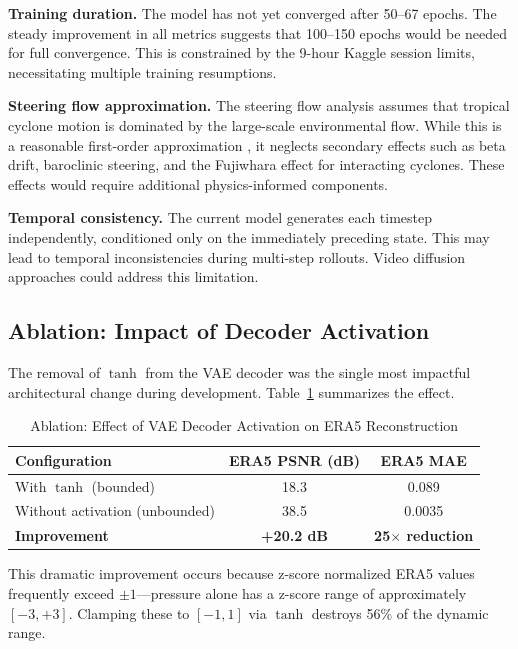 \textbf{Training duration.} The model has not yet converged after 50--67 epochs. The steady improvement in all metrics suggests that 100--150 epochs would be needed for full convergence. This is constrained by the 9-hour Kaggle session limits, necessitating multiple training resumptions.

\textbf{Steering flow approximation.} The steering flow analysis assumes that tropical cyclone motion is dominated by the large-scale environmental flow. While this is a reasonable first-order approximation \cite{chan2005global}, it neglects secondary effects such as beta drift, baroclinic steering, and the Fujiwhara effect for interacting cyclones. These effects would require additional physics-informed components.

\textbf{Temporal consistency.} The current model generates each timestep independently, conditioned only on the immediately preceding state. This may lead to temporal inconsistencies during multi-step rollouts. Video diffusion approaches \cite{ren2025improving} could address this limitation.

\subsection{Ablation: Impact of Decoder Activation}

The removal of $\tanh$ from the VAE decoder was the single most impactful architectural change during development. Table~\ref{tab:ablation_tanh} summarizes the effect.

\begin{table}[H]
\centering
\caption{Ablation: Effect of VAE Decoder Activation on ERA5 Reconstruction}
\label{tab:ablation_tanh}
\begin{tabular}{lcc}
\toprule
\textbf{Configuration} & \textbf{ERA5 PSNR (dB)} & \textbf{ERA5 MAE} \\
\midrule
With $\tanh$ (bounded) & 18.3 & 0.089 \\
Without activation (unbounded) & 38.5 & 0.0035 \\
\midrule
\textbf{Improvement} & \textbf{+20.2 dB} & \textbf{25$\times$ reduction} \\
\bottomrule
\end{tabular}
\end{table}

This dramatic improvement occurs because z-score normalized ERA5 values frequently exceed $\pm 1$---pressure alone has a z-score range of approximately $[-3, +3]$. Clamping these to $[-1, 1]$ via $\tanh$ destroys 56\% of the dynamic range.

